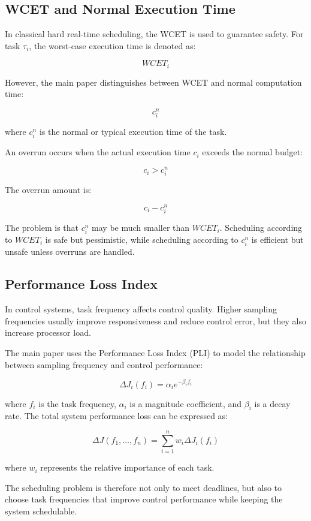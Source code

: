 \documentclass[conference]{IEEEtran}
\begin{document}
\subsection{WCET and Normal Execution Time}

In classical hard real-time scheduling, the WCET is used to guarantee safety. For task $\tau_i$, the worst-case execution time is denoted as:

\[
WCET_i
\]

However, the main paper distinguishes between WCET and normal computation time:

\[
c_i^n
\]

where $c_i^n$ is the normal or typical execution time of the task.

An overrun occurs when the actual execution time $c_i$ exceeds the normal budget:

\[
c_i > c_i^n
\]

The overrun amount is:

\[
c_i - c_i^n
\]

The problem is that $c_i^n$ may be much smaller than $WCET_i$. Scheduling according to $WCET_i$ is safe but pessimistic, while scheduling according to $c_i^n$ is efficient but unsafe unless overruns are handled.

\subsection{Performance Loss Index}

In control systems, task frequency affects control quality. Higher sampling frequencies usually improve responsiveness and reduce control error, but they also increase processor load.

The main paper uses the Performance Loss Index (PLI) to model the relationship between sampling frequency and control performance:

\[
\Delta J_i(f_i) = \alpha_i e^{-\beta_i f_i}
\]

where $f_i$ is the task frequency, $\alpha_i$ is a magnitude coefficient, and $\beta_i$ is a decay rate. The total system performance loss can be expressed as:

\[
\Delta J(f_1, \ldots, f_n) =
\sum_{i=1}^{n} w_i \Delta J_i(f_i)
\]

where $w_i$ represents the relative importance of each task.

The scheduling problem is therefore not only to meet deadlines, but also to choose task frequencies that improve control performance while keeping the system schedulable.
\end{document}
